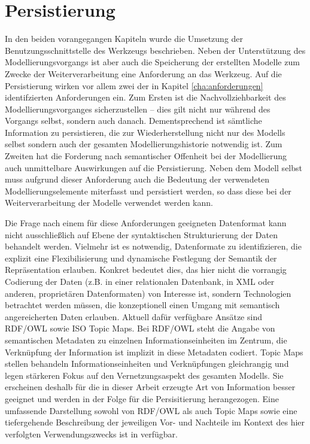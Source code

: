 
\chapter{Persistierung} %
\label{cha:persistierung}

In den beiden vorangegangen Kapiteln wurde die Umsetzung der Benutzungsschnittstelle des Werkzeugs beschrieben. Neben der Unterstützung des Modellierungsvorgangs ist aber auch die Speicherung der erstellten Modelle zum Zwecke der Weiterverarbeitung eine Anforderung an das Werkzeug. Auf die Persistierung wirken vor allem zwei der in Kapitel \ref{cha:anforderungen} identifzierten Anforderungen ein. Zum Ersten ist die Nachvollziehbarkeit des Modellierungsvorganges sicherzustellen -- dies gilt nicht nur während des Vorgangs selbst, sondern auch danach. Dementsprechend ist sämtliche Information zu persistieren, die zur Wiederherstellung nicht nur des Modells selbst sondern auch der gesamten Modellierungshistorie notwendig ist. Zum Zweiten hat die Forderung nach semantischer Offenheit bei der Modellierung auch unmittelbare Auswirkungen auf die Persistierung. Neben dem Modell selbst muss aufgrund dieser Anforderung auch die Bedeutung der verwendeten Modellierungselemente miterfasst und persistiert werden, so dass diese bei der Weiterverarbeitung der Modelle verwendet werden kann.

Die Frage nach einem für diese Anforderungen geeigneten Datenformat kann nicht ausschließlich auf Ebene der syntaktischen Strukturierung der Daten behandelt werden. Vielmehr ist es notwendig, Datenformate zu identifizieren, die explizit eine Flexibilisierung und dynamische Festlegung der Semantik der Repräsentation erlauben. Konkret bedeutet dies, das hier nicht die vorrangig Codierung der Daten (z.B. in einer relationalen Datenbank, in XML oder anderen, proprietären Datenformaten) von Interesse ist, sondern Technologien betrachtet werden müssen, die konzeptionell einen Umgang mit semantisch angereicherten Daten erlauben. Aktuell dafür verfügbare Ansätze sind \gls{RDF}/\gls{OWL} sowie ISO Topic Maps. Bei \gls{RDF}/\gls{OWL} steht die Angabe von semantischen Metadaten zu einzelnen Informationseinheiten im Zentrum, die Verknüpfung der Information ist implizit in diese Metadaten codiert. Topic Maps stellen behandeln Informationseinheiten und Verknüpfungen gleichrangig und legen stärkeren Fokus auf den Vernetzungsaspekt des gesamten Modells. Sie erscheinen deshalb für die in dieser Arbeit erzeugte Art von Information besser geeignet und werden in der Folge für die Persisitierung herangezogen. Eine umfassende Darstellung sowohl von \gls{RDF}/\gls{OWL} als auch Topic Maps sowie eine tiefergehende Beschreibung der jeweiligen Vor- und Nachteile im Kontext des hier verfolgten Verwendungszwecks ist in \citep{Oppl07} verfügbar.

